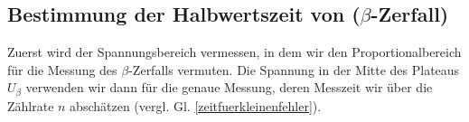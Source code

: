 \subsection{Bestimmung der Halbwertszeit von  ($\beta$-Zerfall)}
Zuerst wird der Spannungsbereich vermessen, in dem wir den Proportionalbereich für die Messung des $\beta$-Zerfalls vermuten. Die Spannung in der Mitte des Plateaus $U_{\beta}$ verwenden wir dann für die genaue Messung, deren Messzeit wir über die Zählrate $n$ abschätzen (vergl. Gl. \ref{zeitfuerkleinenfehler}).